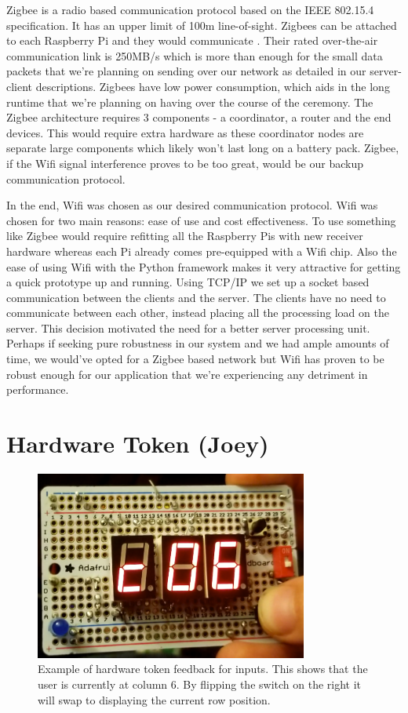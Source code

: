 \documentclass[a4paper,10pt]{article}
\begin{document}
    Zigbee is a radio based communication protocol based on the IEEE 802.15.4 specification. It has an upper limit of 100m line-of-sight. Zigbees can be attached to each Raspberry Pi and they would communicate . Their rated over-the-air communication link is 250MB/s which is more than enough for the small data packets that we're planning on sending over our network as detailed in our server-client descriptions. Zigbees have low power consumption, which aids in the long runtime that we're planning on having over the course of the ceremony. The Zigbee architecture requires 3 components - a coordinator, a router and the end devices. This would require extra hardware as these coordinator nodes are separate large components which likely won't last long on a battery pack. Zigbee, if the Wifi signal interference proves to be too great, would be our backup communication protocol.

In the end, Wifi was chosen as our desired communication protocol. Wifi was chosen for two main reasons: ease of use and cost effectiveness. To use something like Zigbee would require refitting all the Raspberry Pis with new receiver hardware whereas each Pi already comes pre-equipped with a Wifi chip. Also the ease of using Wifi with the Python framework makes it very attractive for getting a quick prototype up and running. Using TCP/IP we set up a socket based communication between the clients and the server. The clients have no need to communicate between each other, instead placing all the processing load on the server. This decision motivated the need for a better server processing unit. Perhaps if seeking pure robustness in our system and we had ample amounts of time, we would've opted for a Zigbee based network but Wifi has proven to be robust enough for our application that we're experiencing any detriment in performance.

\section{Hardware Token (Joey)}
\begin{figure}[H]
  \centering
      \includegraphics[width=0.8\textwidth]{Assets/input.png}
  \caption{Example of hardware token feedback for inputs. This shows that the user is currently at column 6. By flipping the switch on the right it will swap to displaying the current row position.}
\end{figure}
\end{document}
